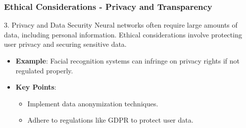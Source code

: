 \documentclass[aspectratio=169]{beamer}
\begin{document}
\begin{frame}[fragile]
    \frametitle{Ethical Considerations - Privacy and Transparency}
    \begin{block}{3. Privacy and Data Security}
        Neural networks often require large amounts of data, including personal information. Ethical considerations involve protecting user privacy and securing sensitive data.
    \end{block}
    \begin{itemize}
        \item \textbf{Example}: Facial recognition systems can infringe on privacy rights if not regulated properly.
        \item \textbf{Key Points}:
        \begin{itemize}
            \item Implement data anonymization techniques.
            \item Adhere to regulations like GDPR to protect user data.
        \end{itemize}
    \end{itemize}
\end{frame}
\end{document}
